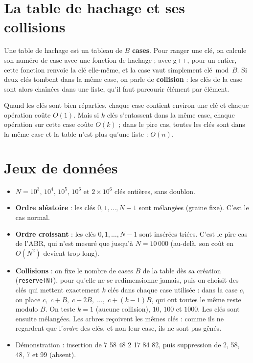 \documentclass[12pt,a4paper]{report}
\begin{document}
\section{La table de hachage et ses collisions}
Une table de hachage est un tableau de $B$ \textbf{cases}. Pour ranger une clé, on calcule son numéro de case avec une fonction de hachage ; avec g++, pour un entier, cette fonction renvoie la clé elle-même, et la case vaut simplement $\text{clé} \bmod B$. Si deux clés tombent dans la même case, on parle de \textbf{collision} : les clés de la case sont alors chaînées dans une liste, qu'il faut parcourir élément par élément.

Quand les clés sont bien réparties, chaque case contient environ une clé et chaque opération coûte $O(1)$. Mais si $k$ clés s'entassent dans la même case, chaque opération sur cette case coûte $O(k)$ ; dans le pire cas, toutes les clés sont dans la même case et la table n'est plus qu'une liste : $O(n)$.

\section{Jeux de données}
\begin{itemize}
  \item $N = 10^3$, $10^4$, $10^5$, $10^6$ et $2\times10^6$ clés entières, sans doublon.
  \item \textbf{Ordre aléatoire} : les clés $0, 1, \dots, N-1$ sont mélangées (graine fixe). C'est le cas normal.
  \item \textbf{Ordre croissant} : les clés $0, 1, \dots, N-1$ sont insérées triées. C'est le pire cas de l'ABR, qui n'est mesuré que jusqu'à $N = 10\,000$ (au-delà, son coût en $O(N^2)$ devient trop long).
  \item \textbf{Collisions} : on fixe le nombre de cases $B$ de la table dès sa création (\texttt{reserve(N)}), pour qu'elle ne se redimensionne jamais, puis on choisit des clés qui mettent exactement $k$ clés dans chaque case utilisée : dans la case $c$, on place $c,\; c+B,\; c+2B,\; \dots,\; c+(k-1)B$, qui ont toutes le même reste modulo $B$. On teste $k = 1$ (aucune collision), $10$, $100$ et $1000$. Les clés sont ensuite mélangées. Les arbres reçoivent les mêmes clés : comme ils ne regardent que l'\emph{ordre} des clés, et non leur case, ils ne sont pas gênés.
  \item Démonstration : insertion de 7 58 48 2 17 84 82, puis suppression de 2, 58, 48, 7 et 99 (absent).
\end{itemize}
\end{document}
